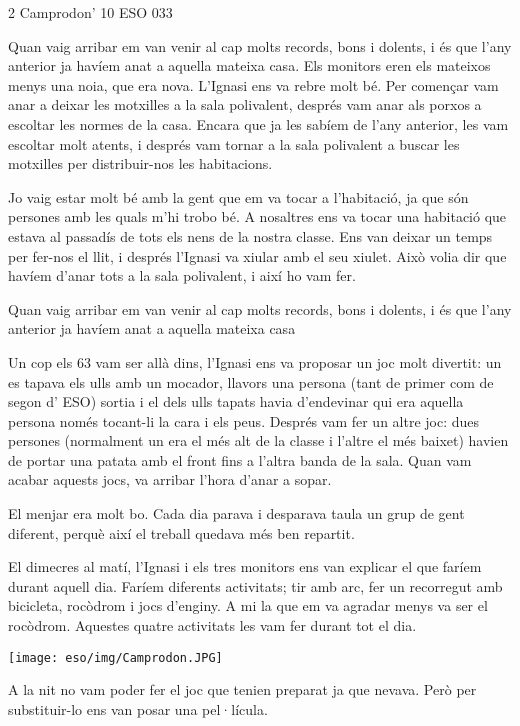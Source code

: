 \begin{news}
{2} %
{Camprodon' 10}
{}
{ESO}
{033} %


Quan vaig arribar em van venir al cap molts records, bons i dolents, i és que l'any anterior ja havíem anat a aquella mateixa casa. Els monitors eren els mateixos menys una noia, que era nova. L'Ignasi ens va rebre molt bé. Per començar vam anar a deixar les motxilles a la sala polivalent, després vam anar als porxos a escoltar les normes de la casa. Encara que ja les sabíem de l'any anterior, les vam escoltar molt atents, i després vam tornar  a la sala polivalent a buscar les motxilles per distribuir-nos  les habitacions.

 Jo vaig estar molt bé amb la gent que em va tocar a l'habitació, ja que són persones amb les quals m'hi trobo bé. A nosaltres ens va tocar una habitació que estava al passadís de tots els nens de la nostra classe. Ens van deixar un temps per fer-nos el llit, i després l'Ignasi va xiular amb el seu xiulet. Això volia dir que havíem d'anar tots a la sala polivalent, i així ho vam fer. 

{Quan vaig arribar em van venir al cap molts records, bons i dolents, i és que l'any anterior ja havíem anat a aquella mateixa casa}

Un cop els 63 vam ser allà dins, l'Ignasi ens va proposar un joc molt divertit: un es tapava els ulls amb un mocador, llavors una persona (tant de primer com de segon d' ESO) sortia i el dels ulls tapats havia d'endevinar qui era aquella persona només tocant-li la cara i els peus. Després vam fer un altre joc: dues persones (normalment un era el més alt de la classe i l'altre el més baixet) havien de portar una patata amb el front fins a l'altra banda de la sala. Quan vam acabar aquests jocs, va arribar l'hora d'anar a sopar. 


El menjar era molt bo. Cada dia parava i desparava taula un grup de gent diferent, perquè així el treball quedava més ben repartit. 

El dimecres al matí, l'Ignasi i els tres monitors ens van explicar el que faríem durant aquell dia. Faríem diferents activitats;  tir amb arc, fer un recorregut amb bicicleta, rocòdrom i jocs d'enginy. A mi la que em va agradar menys va ser el rocòdrom. Aquestes quatre activitats les vam fer durant tot el dia.

{\noindent\texttt{[image: eso/img/Camprodon.JPG]}}

A la nit no vam poder fer el joc que tenien preparat ja que nevava. Però per substituir-lo ens van posar una pel·lícula. 


\end{news}
